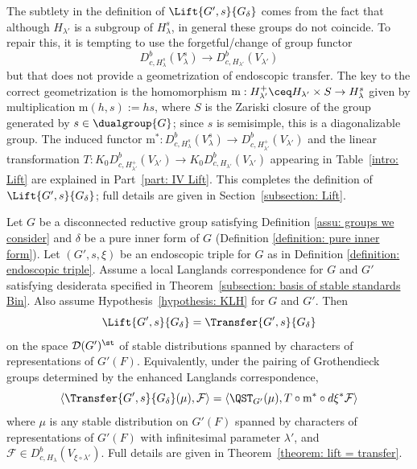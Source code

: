 \documentclass[11pt,letterpaper]{amsart}
\newcommand{\calm}{\textrm{m}}
\numberwithin{equation}{section}
\begin{document}
The subtlety in the definition of $\Lift{G',s}{G_\delta}$ comes from the fact that although $H_{\lambda'}$ is a subgroup of $H_{\lambda}^s$, in general these groups do not coincide. 
To repair this, it is tempting to use the forgetful/change of group functor 
\[
D^b_{c,H_\lambda^s}(V_\lambda^s) 
\to
D^b_{c,H_{\lambda'}}(V_{\lambda'}) 
\]
but that does not provide a geometrization of endoscopic transfer. 
The key to the correct geometrization is the homomorphism $\calm : H^+_{\lambda'}
 \ceq H_{\lambda'} \times S \to H_\lambda^s$
  given by multiplication $\calm(h,s):= hs$, where $S$ is the Zariski closure of the group generated by $s\in \dualgroup{G}$; since $s$ is semisimple, this is a diagonalizable group.
The induced functor $\calm^*: D^b_{c,H_\lambda^s}(V_\lambda^s) \to D^b_{c,H_{\lambda'}^+}(V_{\lambda'})$ and the linear transformation $T: K_0 D^b_{c,H_{\lambda'}^+}(V_{\lambda'}) \to K_0D^b_{c,H_{\lambda'}}(V_{\lambda'})$ appearing in Table~\ref{intro: Lift} are explained in Part~\ref{part: IV Lift}.
This completes the definition of $\Lift{G',s}{G_\delta}$; full details are given in Section~\ref{subsection: Lift}. 




\begin{theorem}[Theorem~\ref{theorem: lift = transfer}]\label{theorem intro: lift = transfer}
Let $G$ be a disconnected reductive group satisfying Definition \ref{assu: groups we consider} and $\delta$ be a pure inner form of $G$ (Definition \ref{definition: pure inner form}).
Let $(G',s,\xi)$ be an endoscopic triple for $G$ as in Definition \ref{definition: endoscopic triple}.
Assume a local Langlands correspondence for $G$ and $G'$ satisfying desiderata specified in Theorem~\ref{subsection: basis of stable standards Bin}.
Also assume Hypothesis~\ref{hypothesis: KLH} for $G$ and $G'$.
Then
\[
{
\Lift{G',s}{G_\delta} 
=
\Transfer{G',s}{G_\delta}
}
\]  
on the space $\mathcal{D}(G')^\st$
of stable distributions spanned by characters of representations of $G'(F)$.
Equivalently, under the pairing of Grothendieck groups determined by the enhanced Langlands correspondence,  
\[
\langle 
\Transfer{G',s}{G_\delta}(\mu) ,
\mathcal{F}
\rangle
=
\langle 
\QST_{G'}(\mu), {T\circ \calm^*\circ d\xi^*}
\mathcal{F}
\rangle
\]
where
    $\mu$ is any stable distribution on $G'(F)$ spanned by characters of representations of $G'(F)$ with infinitesimal parameter $\lambda'$, 
    and $\mathcal{F} \in D^b_{c,H_\lambda}(V_{\xi\circ\lambda'})$.
Full details are given in Theorem~\ref{theorem: lift = transfer}.
\end{theorem}
\end{document}
